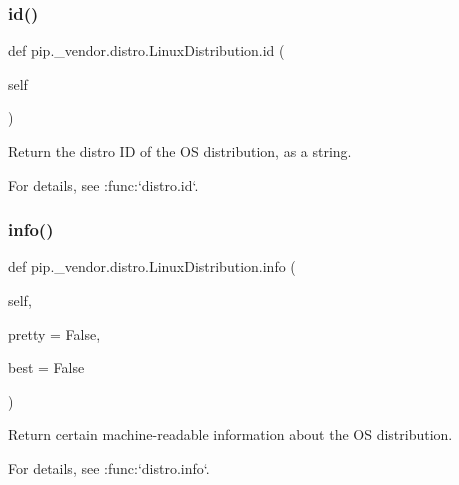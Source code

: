 \subsubsection{\texorpdfstring{id()}{id()}}
{\footnotesize\ttfamily def pip.\+\_\+vendor.\+distro.\+Linux\+Distribution.\+id (\begin{DoxyParamCaption}\item[{}]{self }\end{DoxyParamCaption})}

\begin{DoxyVerb}Return the distro ID of the OS distribution, as a string.

For details, see :func:`distro.id`.
\end{DoxyVerb}
 \mbox{\label{classpip_1_1__vendor_1_1distro_1_1LinuxDistribution_a8d936e9ec6198181f15f5b1bf07f065d}} 
\subsubsection{\texorpdfstring{info()}{info()}}
{\footnotesize\ttfamily def pip.\+\_\+vendor.\+distro.\+Linux\+Distribution.\+info (\begin{DoxyParamCaption}\item[{}]{self,  }\item[{}]{pretty = {\ttfamily False},  }\item[{}]{best = {\ttfamily False} }\end{DoxyParamCaption})}

\begin{DoxyVerb}Return certain machine-readable information about the OS
distribution.

For details, see :func:`distro.info`.
\end{DoxyVerb}
 \mbox{\label{classpip_1_1__vendor_1_1distro_1_1LinuxDistribution_a65bc00eb33209666ff0bda45659b31fe}} 
